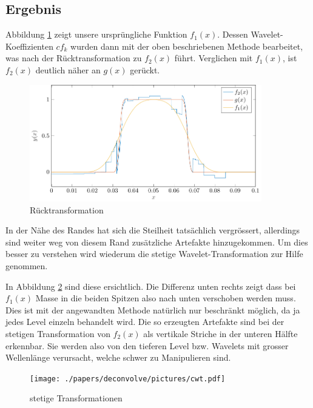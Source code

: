 \subsection{Ergebnis}
Abbildung \ref{deconvolve:result_1d} zeigt unsere ursprüngliche Funktion $f_1(x)$.
Dessen Wavelet-Koeffizienten $cf_k$ wurden dann mit der oben beschriebenen Methode bearbeitet, was nach der Rücktransformation zu $f_2(x)$ führt.
Verglichen mit $f_1(x)$, ist $f_2(x)$ deutlich näher an $g(x)$ gerückt.
\begin{figure}[h]
\centering
\includegraphics[width=0.9\textwidth]{./papers/deconvolve/pictures/result_1d.pdf}
\caption{Rücktransformation\label{deconvolve:result_1d}}
\end{figure}

In der Nähe des Randes hat sich die Steilheit tatsächlich vergrössert, allerdings sind weiter weg von diesem Rand zusätzliche Artefakte hinzugekommen.
Um dies besser zu verstehen wird wiederum die stetige Wavelet-Transformation zur Hilfe genommen.

In Abbildung \ref{deconvolve:cwt} sind diese ersichtlich.
Die Differenz unten rechts zeigt dass bei $f_1(x)$ \glqq Masse\grqq{} in die beiden Spitzen also nach unten verschoben werden muss.
Dies ist mit der angewandten Methode natürlich nur beschränkt möglich, da ja jedes Level einzeln behandelt wird.
Die so erzeugten Artefakte sind bei der stetigen Transformation von $f_2(x)$ als vertikale Striche in der unteren Hälfte erkennbar.
Sie werden also von den tieferen Level bzw. Wavelets mit grosser \glqq Wellenlänge \grqq{} verursacht, welche schwer zu Manipulieren sind.
\begin{figure}[h]
\centering
\texttt{[image: ./papers/deconvolve/pictures/cwt.pdf]}
\caption{stetige Transformationen\label{deconvolve:cwt}}
\end{figure}
